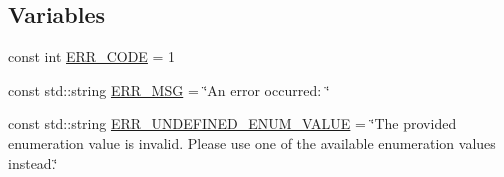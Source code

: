 \subsection*{\-Variables}
\begin{DoxyCompactItemize}
\item 
const int \hyperlink{namespacemultiscale_a4ee40795105048ee371efeeb7962ecf6}{\-E\-R\-R\-\_\-\-C\-O\-D\-E} = 1
\item 
const std\-::string \hyperlink{namespacemultiscale_a06490e4e11ef359aa0260f96579ce584}{\-E\-R\-R\-\_\-\-M\-S\-G} = \char`\"{}\-An error occurred\-: \char`\"{}
\item 
const std\-::string \hyperlink{namespacemultiscale_a870e6a43e813a5df46b265f4986a0510}{\-E\-R\-R\-\_\-\-U\-N\-D\-E\-F\-I\-N\-E\-D\-\_\-\-E\-N\-U\-M\-\_\-\-V\-A\-L\-U\-E} = \char`\"{}\-The provided enumeration value is invalid. \-Please use one of the available enumeration values instead.\char`\"{}
\end{DoxyCompactItemize}


